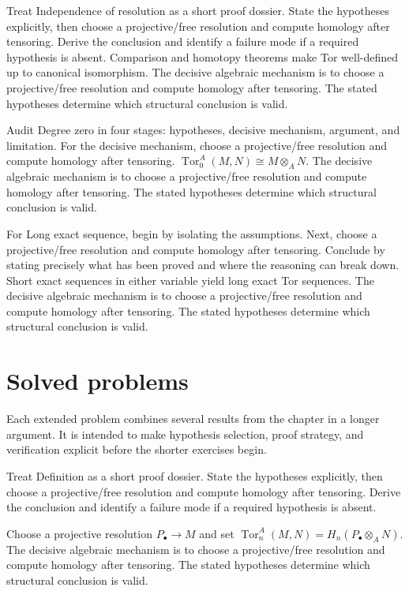 \begin{example}\label{ex:v26-worked-02}
Treat Independence of resolution as a short proof dossier. State the hypotheses explicitly, then choose a projective/free resolution and compute homology after tensoring. Derive the conclusion and identify a failure mode if a required hypothesis is absent. Comparison and homotopy theorems make Tor well-defined up to canonical isomorphism. The decisive algebraic mechanism is to choose a projective/free resolution and compute homology after tensoring. The stated hypotheses determine which structural conclusion is valid.
\end{example}

\begin{example}\label{ex:v26-worked-03}
Audit Degree zero in four stages: hypotheses, decisive mechanism, argument, and limitation. For the decisive mechanism, choose a projective/free resolution and compute homology after tensoring. $\operatorname{Tor}_0^A(M,N)\cong M\otimes_A N$. The decisive algebraic mechanism is to choose a projective/free resolution and compute homology after tensoring. The stated hypotheses determine which structural conclusion is valid.
\end{example}

\begin{example}\label{ex:v26-worked-04}
For Long exact sequence, begin by isolating the assumptions. Next, choose a projective/free resolution and compute homology after tensoring. Conclude by stating precisely what has been proved and where the reasoning can break down. Short exact sequences in either variable yield long exact Tor sequences. The decisive algebraic mechanism is to choose a projective/free resolution and compute homology after tensoring. The stated hypotheses determine which structural conclusion is valid.
\end{example}

\section{Solved problems}
Each extended problem combines several results from the chapter in a longer argument. It is intended to make hypothesis selection, proof strategy, and verification explicit before the shorter exercises begin.

\begin{problem}\label{prob:v26-problem-01}
Treat Definition as a short proof dossier. State the hypotheses explicitly, then choose a projective/free resolution and compute homology after tensoring. Derive the conclusion and identify a failure mode if a required hypothesis is absent.
\end{problem}
\begin{solution}
Choose a projective resolution $P_\bullet\to M$ and set $\operatorname{Tor}_n^A(M,N)=H_n(P_\bullet\otimes_A N)$. The decisive algebraic mechanism is to choose a projective/free resolution and compute homology after tensoring. The stated hypotheses determine which structural conclusion is valid.
\end{solution}

